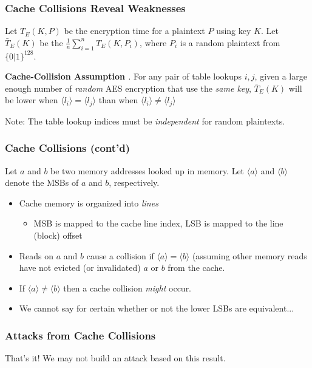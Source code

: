\documentclass[8pt,handout]{beamer}
\begin{document}
\begin{frame}
	\frametitle{Cache Collisions Reveal Weaknesses}
	Let $T_E(K, P)$ be the encryption time for a plaintext $P$ using key $K$. 
	Let $\bar{T}_E(K)$ be the $\frac{1}{n}\sum_{i = 1}^{n}T_E(K, P_i)$, where $P_i$ is a random plaintext from $\{0|1\}^{128}$.

	\medskip

	\textbf{Cache-Collision Assumption \cite{bonneau}}. For any pair of table lookups $i, j$, given
a large enough number of \emph{random} AES encryption that use the \emph{same key}, $\bar{T}_E(K)$ will
be lower when $\langle l_i \rangle = \langle l_j \rangle$ than when $\langle l_i \rangle \not= \langle l_j \rangle$

	\medskip
	
	Note: The table lookup indices must be \emph{independent} for random plaintexts.
\end{frame}

\begin{frame}
	\frametitle{Cache Collisions (cont'd)}
	Let $a$ and $b$ be two memory addresses looked up in memory. Let $\langle a \rangle$ and $\langle b \rangle$ 
	denote the MSBs of $a$ and $b$, respectively. 
	\begin{itemize}
		\item Cache memory is organized into \emph{lines}
		\begin{itemize}
			\item MSB is mapped to the cache line index, LSB is mapped to the line (block) offset
		\end{itemize}
		\item Reads on $a$ and $b$ cause a collision if $\langle a \rangle = \langle b \rangle$ (assuming other memory reads
		have not evicted (or invalidated) $a$ or $b$ from the cache. 
		\item If $\langle a \rangle \not= \langle b \rangle$ then a cache collision \emph{might} occur.
		\item We cannot say for certain whether or not the lower LSBs are equivalent...
	\end{itemize}
\end{frame}

\begin{frame}
	\frametitle{Attacks from Cache Collisions}
	\begin{center}
	That's it! We may not build an attack based on this result.
	\end{center}
\end{frame}
\end{document}
